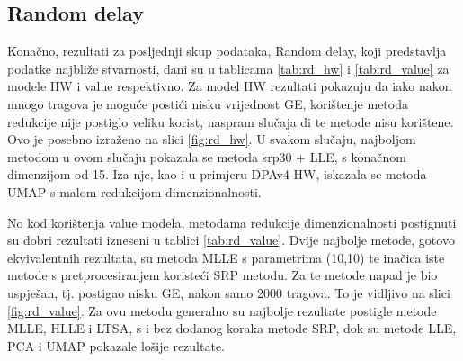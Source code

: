\documentclass[times, utf8, diplomski]{fer}
\begin{document}
\subsection{Random delay}
Konačno, rezultati za posljednji skup podataka, Random delay, koji predstavlja podatke najbliže stvarnosti, dani su u tablicama \ref{tab:rd_hw} i \ref{tab:rd_value} za modele HW i value respektivno. Za model HW rezultati pokazuju da iako nakon mnogo tragova je moguće postići nisku vrijednost GE, korištenje metoda redukcije nije postiglo veliku korist, naspram slučaja di te metode nisu korištene. Ovo je posebno izraženo na slici \ref{fig:rd_hw}. U svakom slučaju, najboljom metodom u ovom slučaju pokazala se metoda srp30 + LLE, s konačnom dimenzijom od 15. Iza nje, kao i u primjeru DPAv4-HW, iskazala se metoda UMAP s malom redukcijom dimenzionalnosti.

No kod korištenja value modela, metodama redukcije dimenzionalnosti postignuti su dobri rezultati izneseni u tablici \ref{tab:rd_value}. Dvije najbolje metode, gotovo ekvivalentnih rezultata, su metoda MLLE s parametrima (10,10) te inačica iste metode s pretprocesiranjem koristeći SRP metodu. Za te metode napad je bio uspješan, tj. postigao nisku GE, nakon samo 2000 tragova. To je vidljivo na slici \ref{fig:rd_value}. Za ovu metodu generalno su najbolje rezultate postigle metode MLLE, HLLE i LTSA, s i bez dodanog koraka metode SRP, dok su metode LLE, PCA i UMAP pokazale lošije rezultate. 
\end{document}
